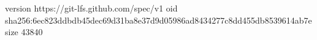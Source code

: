 version https://git-lfs.github.com/spec/v1
oid sha256:6ec823ddbdb45dec69d31ba8e37d9d05986ad8434277c8dd455db8539614ab7e
size 43840
